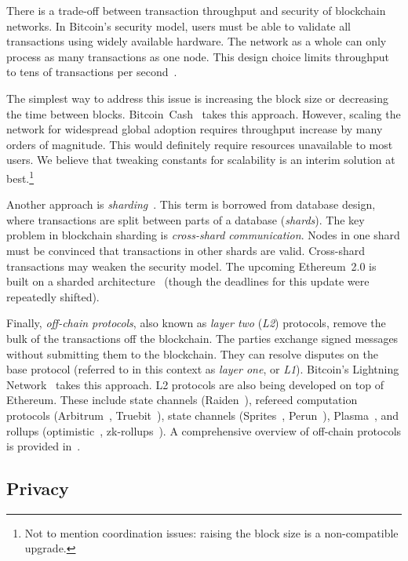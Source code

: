 There is a trade-off between transaction throughput and security of blockchain networks.
In Bitcoin's security model, users must be able to validate all transactions using widely available hardware.
The network as a whole can only process as many transactions as one node.
This design choice limits throughput to tens of transactions per second~\cite{Croman2016}.

The simplest way to address this issue is increasing the block size or decreasing the time between blocks.
Bitcoin~Cash~\cite{Kwon2019} takes this approach.
However, scaling the network for widespread global adoption requires throughput increase by many orders of magnitude.
This would definitely require resources unavailable to most users.
We believe that tweaking constants for scalability is an interim solution at best.\footnote{Not to mention coordination issues: raising the block size is a non-compatible upgrade.}

Another approach is \textit{sharding}~\cite{Gencer2016, Luu2016a}.
This term is borrowed from database design, where transactions are split between parts of a database (\textit{shards}).
The key problem in blockchain sharding is \textit{cross-shard communication}.
Nodes in one shard must be convinced that transactions in other shards are valid.
Cross-shard transactions may weaken the security model.
The upcoming Ethereum~2.0 is built on a sharded architecture~\cite{ShardingFAQ} (though the deadlines for this update were repeatedly shifted).

Finally, \textit{off-chain protocols}, also known as \textit{layer two} (\textit{L2}) protocols, remove the bulk of the transactions off the blockchain.
The parties exchange signed messages without submitting them to the blockchain.
They can resolve disputes on the base protocol (referred to in this context as \textit{layer one}, or \textit{L1}).
Bitcoin's Lightning Network~\cite{Poon2016} takes this approach.
L2 protocols are also being developed on top of Ethereum.
These include state channels (Raiden~\cite{RaidenWebsite}), refereed computation protocols (Arbitrum~\cite{Kalodner2018}, Truebit~\cite{Teutsch2017}), state channels (Sprites~\cite{Miller2019}, Perun~\cite{Dziembowski2017}), Plasma~\cite{Poon2017}, and rollups (optimistic~\cite{Floersch2019}, zk-rollups~\cite{Gluchowski2019}).
A comprehensive overview of off-chain protocols is provided in~\cite{Gudgeon2019}.


\subsection{Privacy}

